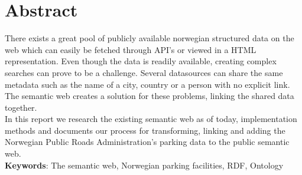 \chapter*{Abstract}
There exists a great pool of publicly available norwegian structured data on the web which can easily be fetched through API's or viewed in a HTML representation. Even though the data is readily available, creating complex searches can prove to be a challenge. Several datasources can share the same metadata such as the name of a city, country or a person with no explicit link. The semantic web creates a solution for these problems, linking the shared data together.\\

In this report we research the existing semantic web as of today, implementation methods and documents our process for transforming, linking and adding the Norwegian Public Roads Administration's parking data to the public semantic web.\\

\textbf{Keywords}: The semantic web, Norwegian parking facilities, RDF, Ontology
